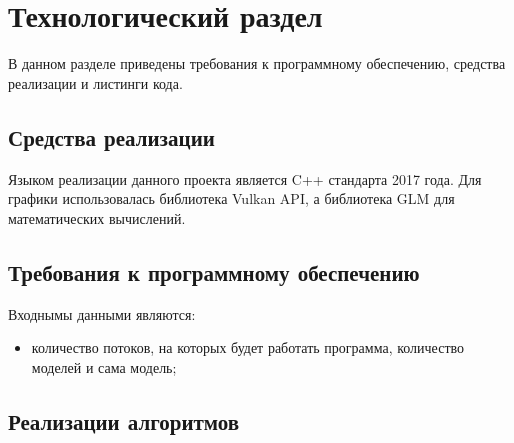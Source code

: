 \chapter{Технологический раздел}
\label{cha:impl}

В данном разделе приведены требования к программному обеспечению, средства реализации и листинги кода. 

\section{Средства реализации}
Языком реализации данного проекта является C++ стандарта 2017 года. Для графики использовалась библиотека Vulkan API, а библиотека GLM для математических вычислений. 

\section{Требования к программному обеспечению}
Входнымы данными являются:
\begin{itemize}
    \item количество потоков, на которых будет работать программа, количество моделей и сама модель;
\end{itemize}

\section{Реализации алгоритмов}

